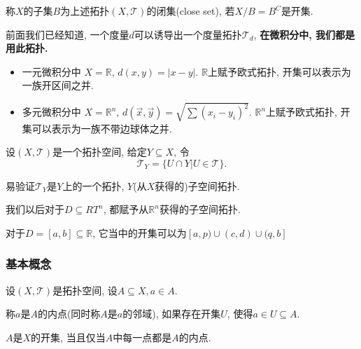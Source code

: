 
\begin{definition}
    称$X$的子集$B$为上述拓扑$\left( X,\mathscr{T} \right) $的闭集(close set), 若$X / B = B^{C}$是开集.
\end{definition}

前面我们已经知道, 一个度量$d$可以诱导出一个度量拓扑$\mathscr{T}_{d}$, \textbf{在微积分中, 我们都是用此拓扑.}
\begin{itemize}
    \item 一元微积分中 $X = \mathbb{R}$, $d \left( x,y \right)  = \left| x -  y \right|$. $\mathbb{R}$上赋予欧式拓扑, 开集可以表示为一族开区间之并.
    
    \item 多元微积分中 $X = \mathbb{R}^{n}$, $d\left( \vec{x},\vec{y} \right)  = \sqrt{\sum \left( x_i  - y_i \right) ^{2}}$. $\mathbb{R}^{n}$上赋予欧式拓扑, 开集可以表示为一族不带边球体之并.
\end{itemize}

\begin{definition}
    设$\left( X, \mathscr{T} \right) $是一个拓扑空间, 给定$Y \subseteq X$, 令
    \begin{equation}
      \mathscr{T}_{Y} = \{ U \cap Y | U \in \mathscr{T} \}.
    \end{equation}
\end{definition}
易验证$\mathscr{T}_{Y}$是$Y$上的一个拓扑, $Y$(从$X$获得的)子空间拓扑.

我们以后对于$D \subseteq RT^{n}$, 都赋予从$\mathbb{R}^{n}$获得的子空间拓扑.

\begin{example}
    对于$D = [a,b] \subseteq  \mathbb{R}$, 它当中的开集可以为$[a,p) \cup (c,d) \cup (q,b]$
\end{example}

\subsubsection{基本概念}
\begin{definition}
    设$\left( X, \mathscr{T} \right) $是拓扑空间, 设$A \subseteq X, a \in A$.
    
    称$a$是$A$的内点(同时称$A$是$a$的邻域), 如果存在开集$U$, 使得$a \in U \subseteq A$.
\end{definition}

\begin{proposition}
    $A$是$X$的开集, 当且仅当$A$中每一点都是$A$的内点.
\end{proposition}

